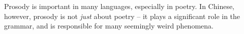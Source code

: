 \documentclass[../main.tex]{subfiles}
\begin{document}
Prosody is important in many languages, especially in poetry. 
In Chinese, however, prosody is not \emph{just} about poetry -- it plays a significant role in the grammar,
and is responsible for many seemingly weird phenomena.
\end{document}
